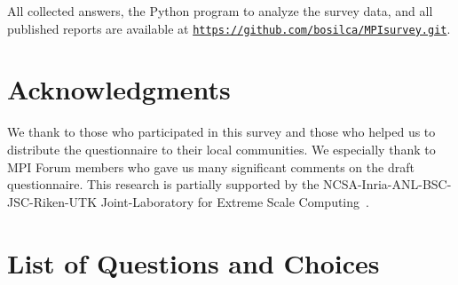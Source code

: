 \documentclass[conference,10pt,letterpaper]{IEEEtran}
\begin{document}
All collected answers, the Python program to analyze the survey data,
and all published reports are available at
{\tt \url{https://github.com/bosilca/MPIsurvey.git}}. 

\section*{Acknowledgments}

We thank to those who participated in this survey and those who
helped us to distribute the questionnaire to their local
communities. We especially thank to MPI Forum members who gave us many
significant comments on the draft questionnaire.
This research is partially supported by the
NCSA-Inria-ANL-BSC-JSC-Riken-UTK Joint-Laboratory for Extreme Scale
Computing~\cite{JLESC}.




\appendix
\section{List of Questions and Choices}
\label{app:questions}
\end{document}
